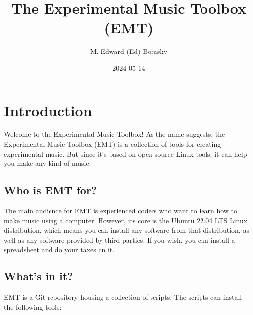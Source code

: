 \documentclass[
  letterpaper,
  DIV=11,
  numbers=noendperiod]{scrreprt}
\title{The Experimental Music Toolbox (EMT)}
\author{M. Edward (Ed) Borasky}
\date{2024-05-14}
\renewcommand*\contentsname{Table of contents}
\newcommand\contentsname{Table of contents}
\begin{document}
\maketitle

\renewcommand*\contentsname{Table of contents}
{
\hypersetup{linkcolor=}
\setcounter{tocdepth}{2}
\tableofcontents
}

\chapter*{Introduction}\label{introduction}


Welcome to the Experimental Music Toolbox! As the name suggests, the
Experimental Music Toolbox (EMT) is a collection of tools for creating
experimental music. But since it's based on open source Linux tools, it
can help you make any kind of music.

\section*{Who is EMT for?}\label{who-is-emt-for}


The main audience for EMT is experienced coders who want to learn how to
make music using a computer. However, its core is the Ubuntu 22.04 LTS
Linux distribution, which means you can install any software from that
distribution, as well as any software provided by third parties. If you
wish, you can install a spreadsheet and do your taxes on it.

\section*{What's in it?}\label{whats-in-it}


EMT is a Git repository housing a collection of scripts. The scripts can
install the following tools:
\end{document}
